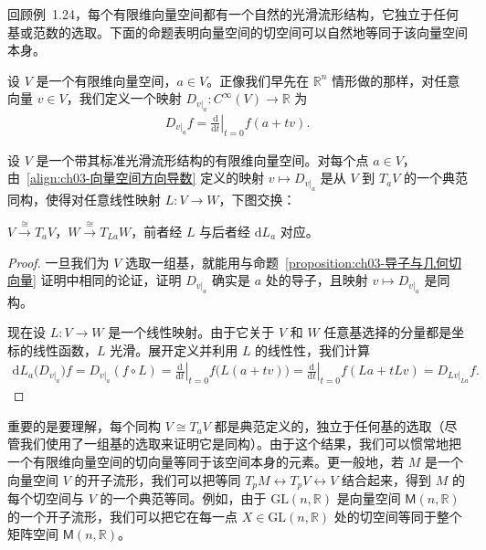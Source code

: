 \documentclass[../../main.tex]{subfiles}
\begin{document}
回顾例~1.24，每个有限维向量空间都有一个自然的光滑流形结构，它独立于任何基或范数的选取。下面的命题表明向量空间的切空间可以自然地等同于该向量空间本身。

设 $V$ 是一个有限维向量空间，$a\in V$。正像我们早先在 $\mathbb{R}^{n}$ 情形做的那样，对任意向量 $v\in V$，我们定义一个映射 $D_{v|_{a}}:C^{\infty}(V)\to\mathbb{R}$ 为
\begin{align}\label{align:ch03-向量空间方向导数}
D_{v|_{a}}f=\left.\frac{\mathrm{d}}{\mathrm{d}t}\right|_{t=0}f(a+tv).
\end{align}

\begin{proposition}[向量空间的切空间]\label{proposition:ch03-向量空间切空间}
设 $V$ 是一个带其标准光滑流形结构的有限维向量空间。对每个点 $a\in V$，由~\eqref{align:ch03-向量空间方向导数} 定义的映射 $v\mapsto D_{v|_{a}}$ 是从 $V$ 到 $T_{a}V$ 的一个典范同构，使得对任意线性映射 $L:V\to W$，下图交换：
\begin{center}
$V\xrightarrow{\cong}T_{a}V$，$W\xrightarrow{\cong}T_{La}W$，前者经 $L$ 与后者经 $\mathrm{d}L_{a}$ 对应。
\end{center}
\end{proposition}

\begin{proof}
一旦我们为 $V$ 选取一组基，就能用与命题~\cref{proposition:ch03-导子与几何切向量} 证明中相同的论证，证明 $D_{v|_{a}}$ 确实是 $a$ 处的导子，且映射 $v\mapsto D_{v|_{a}}$ 是同构。

现在设 $L:V\to W$ 是一个线性映射。由于它关于 $V$ 和 $W$ 任意基选择的分量都是坐标的线性函数，$L$ 光滑。展开定义并利用 $L$ 的线性性，我们计算
\begin{align*}
\mathrm{d}L_{a}\bigl(D_{v|_{a}}\bigr)f=D_{v|_{a}}(f\circ L)
=\left.\frac{\mathrm{d}}{\mathrm{d}t}\right|_{t=0}f\bigl(L(a+tv)\bigr)
=\left.\frac{\mathrm{d}}{\mathrm{d}t}\right|_{t=0}f(La+tLv)
=D_{Lv|_{La}}f.
\end{align*}
\end{proof}

重要的是要理解，每个同构 $V\cong T_{a}V$ 都是典范定义的，独立于任何基的选取（尽管我们使用了一组基的选取来证明它是同构）。由于这个结果，我们可以惯常地把一个有限维向量空间的切向量等同于该空间本身的元素。更一般地，若 $M$ 是一个向量空间 $V$ 的开子流形，我们可以把等同 $T_{p}M\leftrightarrow T_{p}V\leftrightarrow V$ 结合起来，得到 $M$ 的每个切空间与 $V$ 的一个典范等同。例如，由于 $\mathrm{GL}(n,\mathbb{R})$ 是向量空间 $\mathsf{M}(n,\mathbb{R})$ 的一个开子流形，我们可以把它在每一点 $X\in\mathrm{GL}(n,\mathbb{R})$ 处的切空间等同于整个矩阵空间 $\mathsf{M}(n,\mathbb{R})$。
\end{document}

